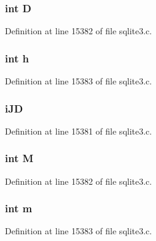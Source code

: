 \subsubsection[{D}]{\setlength{\rightskip}{0pt plus 5cm}int D}\label{struct_date_time_abf6d0ccec2f5157184071729f129de19}


Definition at line 15382 of file sqlite3.\+c.

\hypertarget{struct_date_time_a16611451551e3d15916bae723c3f59f7}{}
\subsubsection[{h}]{\setlength{\rightskip}{0pt plus 5cm}int h}\label{struct_date_time_a16611451551e3d15916bae723c3f59f7}


Definition at line 15383 of file sqlite3.\+c.

\hypertarget{struct_date_time_aeefbd0fbabdd6a69ad04b1a9e198f53e}{}
\subsubsection[{i\+J\+D}]{ i\+J\+D}\label{struct_date_time_aeefbd0fbabdd6a69ad04b1a9e198f53e}


Definition at line 15381 of file sqlite3.\+c.

\hypertarget{struct_date_time_a5e78dbd5fd0fc01ba7b98dd15e27221e}{}
\subsubsection[{M}]{\setlength{\rightskip}{0pt plus 5cm}int M}\label{struct_date_time_a5e78dbd5fd0fc01ba7b98dd15e27221e}


Definition at line 15382 of file sqlite3.\+c.

\hypertarget{struct_date_time_a742204794ea328ba293fe59cec79b990}{}
\subsubsection[{m}]{\setlength{\rightskip}{0pt plus 5cm}int m}\label{struct_date_time_a742204794ea328ba293fe59cec79b990}


Definition at line 15383 of file sqlite3.\+c.

